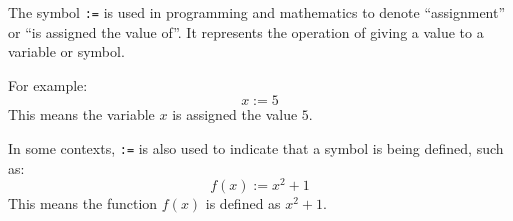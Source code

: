 




\begin{Def}[Symbol ``\texttt{:=}'']

    The symbol \texttt{:=} is used in programming and mathematics to denote ``assignment'' or ``is assigned the value of''. 
    It represents the operation of giving a value to a variable or symbol.

    \vspace{1em}
    \noindent
    For example:
    \[
    x := 5
    \]
    This means the variable $x$ is assigned the value $5$.

    \vspace{1em}
    \noindent
    In some contexts, \texttt{:=} is also used to indicate that a symbol is being defined, such as:
    \[
    f(x) := x^2 + 1
    \]
    This means the function $f(x)$ is defined as $x^2 + 1$.
\end{Def}




